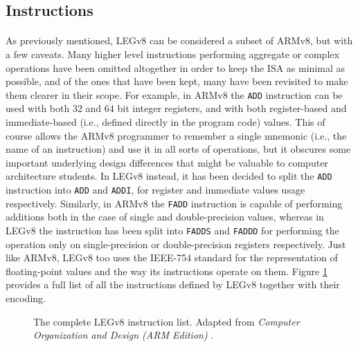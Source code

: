 \subsection{Instructions}
\paragraph{}
As previously mentioned, LEGv8 can be considered a subset of ARMv8, but with a few caveats. Many higher level instructions performing aggregate or complex operations have been omitted altogether in order to keep the ISA as minimal as possible, and of the ones that have been kept, many have been revisited to make them clearer in their scope. For example, in ARMv8 the \verb|ADD| instruction can be used with both 32 and 64 bit integer registers, and with both register-based and immediate-based (i.e., defined directly in the program code) values. This of course allows the ARMv8 programmer to remember a single mnemonic (i.e., the name of an instruction) and use it in all sorts of operations, but it obscures some important underlying design differences that might be valuable to computer architecture students. In LEGv8 instead, it has been decided to split the \verb|ADD| instruction into \verb|ADD| and \verb|ADDI|, for register and immediate values usage respectively. Similarly, in ARMv8 the \verb|FADD| instruction is capable of performing additions both in the case of single and double-precision values, whereas in LEGv8 the instruction has been split into \verb|FADDS| and \verb|FADDD| for performing the operation only on single-precision or double-precision registers respectively. Just like ARMv8, LEGv8 too uses the IEEE-754 standard \cite{ieee754} for the representation of floating-point values and the way its instructions operate on them. Figure \ref{fig:legv8instrlist} provides a full list of all the instructions defined by LEGv8 together with their encoding.
\begin{figure}[H]
	\centering
	\caption{The complete LEGv8 instruction list. Adapted from \emph{Computer Organization and Design (ARM Edition)} \cite{patterson2016computer}.}
    \label{fig:legv8instrlist}
\end{figure}
